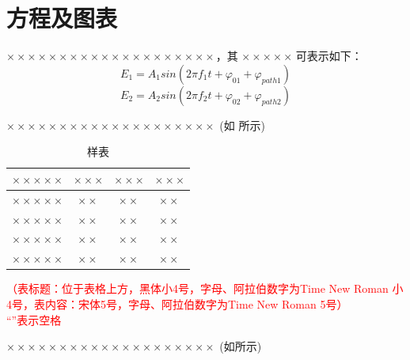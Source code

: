 \documentclass[a4paper]{article}
\begin{document}
\sectionbreak
\section{方程及图表}
\hspace{12em}

$ \times\times\times\times\times\times\times\times\times\times\times\times\times\times\times\times\times\times\times\times $，其 $ \times\times\times\times\times$ 可表示如下：
\begin{equation}
	E_{1}=A_{1}sin\!\left(2\pi f_{1}t+\varphi_{01}+\varphi_{path1} \right)
\end{equation}
\begin{equation}
	E_{2}=A_{2}sin\!\left(2\pi f_{2}t+\varphi_{02}+\varphi_{path2} \right)
\end{equation}

$ \times\times\times\times\times\times\times\times\times\times\times\times\times\times\times\times\times\times\times\times $  (如 所示)

\begin{table}[htpb]
	\centering
	\caption{样表}
	\label{table1}
	\song\wuhao\bfseries
	\begin{tabular}{cccc}
		\toprule
		$ \times\times\times\times\times $ & $ \times\times\times $ & $ \times\times\times $ & $ \times\times\times $ \\
		\hline
		$ \times\times\times\times\times $ & $ \times\times $       & $ \times\times $       & $ \times\times $       \\
		$ \times\times\times\times\times $ & $ \times\times $       & $ \times\times $       & $ \times\times $       \\
		$ \times\times\times\times\times $ & $ \times\times $       & $ \times\times $       & $ \times\times $       \\ 	    	\cline{2-4}
		$ \times\times\times\times\times $ & $ \times\times $       & $ \times\times $       & $ \times\times $       \\
		\bottomrule
	\end{tabular}
\end{table}
\textcolor{red}{（表标题：位于表格上方，黑体小4号，字母、阿拉伯数字为Time New Roman 小4号，表内容：宋体5号，字母、阿拉伯数字为Time New Roman 5号）\\ ``\fbox{\phantom{a}}''表示空格}

$ \times\times\times\times\times\times\times\times\times\times\times\times\times\times\times\times\times\times\times\times $  (如所示)
\end{document}
